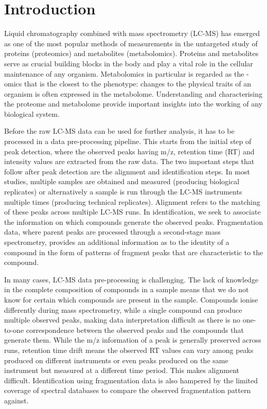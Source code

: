 \chapter{Introduction}
\label{c:intro}

Liquid chromatography combined with mass spectrometry (LC-MS) has emerged as one of the most popular methods of measurements in the untargeted study of proteins (proteomics) and metabolites (metabolomics). Proteins and metabolites serve as crucial building blocks in the body and play a vital role in the cellular maintenance of any organism. Metabolomics in particular is regarded as the -omics that is the closest to the phenotype: changes to the physical traits of an organism is often expressed in the metabolome. Understanding and characterising the proteome and metabolome provide important insights into the working of any biological system.

Before the raw LC-MS data can be used for further analysis, it has to be processed in a data pre-processing pipeline. This starts from the initial step of peak detection, where the observed peaks having m/z, retention time (RT) and intensity values are extracted from the raw data. The two important steps that follow after peak detection are the alignment and identification steps. In most studies, multiple samples are obtained and measured (producing biological replicates) or alternatively a sample is run through the LC-MS instruments multiple times (producing technical replicates). Alignment refers to the matching of these peaks across multiple LC-MS runs. In identification, we seek to associate the information on which compounds generate the observed peaks. Fragmentation data, where parent peaks are processed through a second-stage mass spectrometry, provides an additional information as to the identity of a compound in the form of patterns of fragment peaks that are characteristic to the compound.

In many cases, LC-MS data pre-processing is challenging. The lack of knowledge in the complete composition of compounds in a sample means that we do not know for certain which compounds are present in the sample. Compounds ionise differently during mass spectrometry, while a single compound can produce multiple observed peaks, making data interpretation difficult as there is no one-to-one correspondence between the observed peaks and the compounds that generate them. While the m/z information of a peak is generally preserved across runs, retention time drift means the observed RT values can vary among peaks produced on different instruments or even peaks produced on the same instrument but measured at a different time period. This makes alignment difficult. Identification using fragmentation data is also hampered by the limited coverage of spectral databases to compare the observed fragmentation pattern against. 

